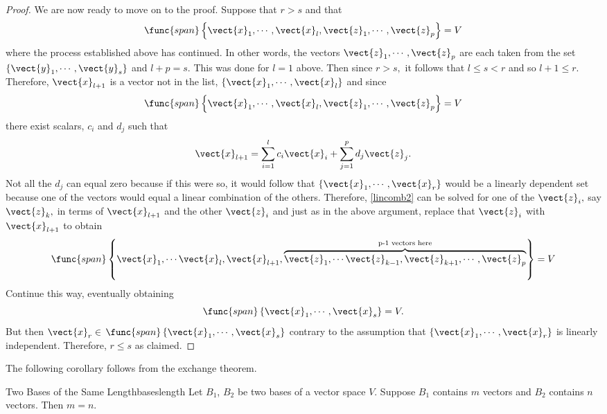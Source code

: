\begin{proof}
We are now ready to move on to the proof. Suppose that $r>s$ and that 
\[
\func{span}\left\{ \vect{x}_{1},\cdots ,
\vect{x}_{l},\vect{z}_{1},\cdots ,\vect{z}_{p}\right\} =V
\]
 where the process established above has continued. In other words, the vectors $\vect{z}_{1},\cdots ,\vect{z}_{p}$ are each taken from the
set $\left\{ \vect{y}_{1},\cdots ,\vect{y}_{s}\right\} $ and $l+p=s.$
This was done for $l=1$ above. Then since $r>s,$ it follows that $
l\leq s<r$ and so $l+1\leq r.$ Therefore, $\vect{x}_{l+1}$ is a vector not
in the list, $\left\{ \vect{x}_{1},\cdots ,\vect{x}_{l}\right\} $ and
since 
\[
\func{span}\left\{ \vect{x}_{1},\cdots ,\vect{x}_{l},\vect{z}
_{1},\cdots ,\vect{z}_{p}\right\} =V
\]
 there exist scalars, $c_{i}$ and $
d_{j}$ such that 
\begin{equation}
\vect{x}_{l+1}=\sum_{i=1}^{l}c_{i}\vect{x}_{i}+\sum_{j=1}^{p}d_{j}
\vect{z}_{j}.  \label{lincomb2}
\end{equation}
Not all the $d_{j}$ can equal zero because if this were so, it would follow
that $\left\{ \vect{x}_{1},\cdots ,\vect{x}_{r}\right\} $ would be a
linearly dependent set because one of the vectors would equal a linear
combination of the others. Therefore, \ref{lincomb2} can be solved for one of the 
$\vect{z}_{i},$ say $\vect{z}_{k},$ in terms of $\vect{x}_{l+1}$ and
the other $\vect{z}_{i}$ and just as in the above argument, replace that $
\vect{z}_{i}$ with $\vect{x}_{l+1}$ to obtain 
\begin{equation*}
\func{span}\left\{ \vect{x}_{1},\cdots \vect{x}_{l},\vect{x}_{l+1},
\overset{\text{p-1 vectors here}}{\overbrace{\vect{z}_{1},\cdots \vect{z}
_{k-1},\vect{z}_{k+1},\cdots ,\vect{z}_{p}}}\right\} =V
\end{equation*}
Continue this way, eventually obtaining 
\begin{equation*}
\func{span}\left\{ \vect{x}_{1},\cdots ,\vect{x}_{s}\right\} =V.
\end{equation*}
But then $\vect{x}_{r}\in $ $\func{span}\left\{ \vect{x}_{1},\cdots ,
\vect{x}_{s}\right\} $ contrary to the assumption that $\left\{ \vect{x}
_{1},\cdots ,\vect{x}_{r}\right\} $ is linearly independent. Therefore, $
r\leq s$ as claimed.
\end{proof}

The following corollary follows from the exchange theorem.

\begin{corollary}{Two Bases of the Same Length}{baseslength}
Let $B_1$, $B_2$ be two bases of a vector space $V$. Suppose $B_1$ contains $m$ vectors and $B_2$ contains $n$ vectors. Then $m = n$. 
\end{corollary}


